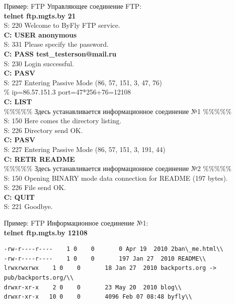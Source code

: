\begin{frame}{Пример: FTP}
Управляющее соединение FTP:\\
\medskip
\tiny
	{\bfseries telnet ftp.mgts.by 21}\\
	S: 220 Welcome to ByFly FTP service.\\
	{\bfseries C: USER anonymous}\\
	S: 331 Please specify the password.\\
	{\bfseries C: PASS test\_testerson@mail.ru}\\
	S: 230 Login successful.\\
	{\bfseries C: PASV}\\
	S: 227 Entering Passive Mode (86, 57, 151, 3, 47, 76)\\
	\% ip=86.57.151.3 port=47*256+76=12108\\
	{\bfseries C: LIST}\\
	\%\%\%\%\% Здесь устанавливается информационное соединение №1 \%\%\%\%\%\\
	S: 150 Here comes the directory listing.\\
	S: 226 Directory send OK.\\
	{\bfseries C: PASV}\\
	S: 227 Entering Passive Mode (86, 57, 151, 3, 191, 44)\\
	{\bfseries C: RETR README}\\
	\%\%\%\%\% Здесь устанавливается информационное соединение №2 \%\%\%\%\%\\
	S: 150 Opening BINARY mode data connection for README (197 bytes).\\
	S: 226 File send OK.\\
	{\bfseries C: QUIT}\\
	S: 221 Goodbye.\\

\normalsize
\end{frame}

\begin{frame}{Пример: FTP}
Информационное соединение №1:\\
\medskip
\scriptsize
{\bfseries telnet ftp.mgts.by 12108}\\
\begin{verbatim}
-rw-r----r----    1 0    0       0 Apr 19  2010 2ban\_me.html\\
-rw-r----r----    1 0    0       197 Jan 27  2010 README\\
lrwxrwxrwx    1 0    0       18 Jan 27  2010 backports.org -> pub/backports.org/\\
drwxr-xr-x    2 0    0       23 May 20  2010 blog\\
drwxr-xr-x   10 0    0       4096 Feb 07 08:48 byfly\\
\end{verbatim}
\normalsize
\end{frame}

